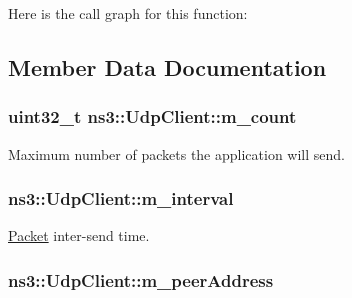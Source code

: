 Here is the call graph for this function\+:




\subsection{Member Data Documentation}
\subsubsection[{\texorpdfstring{m\+\_\+count}{m_count}}]{\setlength{\rightskip}{0pt plus 5cm}uint32\+\_\+t ns3\+::\+Udp\+Client\+::m\+\_\+count\hspace{0.3cm}{\ttfamily [private]}}\hypertarget{classns3_1_1UdpClient_aa42e5fec49376e6a5de8a8d6fecb3654}{}\label{classns3_1_1UdpClient_aa42e5fec49376e6a5de8a8d6fecb3654}


Maximum number of packets the application will send. 

\subsubsection[{\texorpdfstring{m\+\_\+interval}{m_interval}}]{ ns3\+::\+Udp\+Client\+::m\+\_\+interval\hspace{0.3cm}{\ttfamily [private]}}\hypertarget{classns3_1_1UdpClient_a10be8f529aed10334cfb1239b231b7a0}{}\label{classns3_1_1UdpClient_a10be8f529aed10334cfb1239b231b7a0}


\hyperlink{classns3_1_1Packet}{Packet} inter-\/send time. 

\subsubsection[{\texorpdfstring{m\+\_\+peer\+Address}{m_peerAddress}}]{ ns3\+::\+Udp\+Client\+::m\+\_\+peer\+Address\hspace{0.3cm}{\ttfamily [private]}}\hypertarget{classns3_1_1UdpClient_abda566e33a7381c7ce53e7f9aae39013}{}\label{classns3_1_1UdpClient_abda566e33a7381c7ce53e7f9aae39013}


